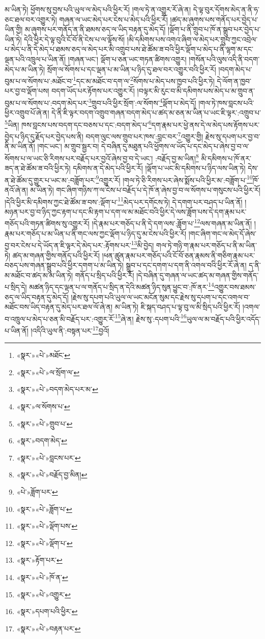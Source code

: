 མ་ཡིན་ཏེ། ཕྱོགས་སུ་བྱས་པའི་ཡུལ་ལ་མེད་པའི་ཕྱིར་རོ། །གལ་ཏེ་ན་འགྱུར་རོ་ཞེ་ན། དེ་ལྟ་བུར་དོགས་མེད་ན་ནི་ཧ་ཅང་ཐལ་བར་འགྱུར་ཏེ། གཞན་ལ་ཡང་མེད་པར་ངེས་པ་མེད་པའི་ཕྱིར་རོ། །ཚད་མ་ཞུགས་པས་གནོད་པར་བྱེད་པ་ཡིན་གྱི། མ་ཞུགས་པར་གནོད་ན་ནི་ཐམས་ཅད་ལ་ཡིད་བརྟན་དུ་མེད་དོ། །ལྡོག་པ་ནི་གྲུབ་པ་ཁོ་ན་སྒྲུབ་པར་བྱེད་པ་ཡིན་ཏེ། དེའི་ཕྱིར་དེ་ལྟ་བུའི་ངོ་བོ་ནི་ངེས་པ་ལ་ལྟོས་སོ། །མི་དམིགས་པས་འགའ་ཞིག་ལ་མེད་པར་གྲུབ་ཀྱང་འབྲེལ་པ་མེད་པ་ནི་དེ་མེད་པ་ཐམས་ཅད་ལ་མེད་པར་མི་འགྲུབ་པས་ཐེ་ཚོམ་ཟ་བའི་ཕྱིར་ལྡོག་པ་མེད་པ་ནི་ལྷག་མ་དང་ལྡན་པའི་འཁྲུལ་པ་ཡིན་ནོ། །གཞན་ཡང་། ལྡོག་པ་ཅན་ཡང་གཏན་ཚིགས་འགྱུར། །གསོན་པའི་ལུས་འདི་ནི་བདག་མེད་པ་མ་ཡིན་ཏེ། སྲོག་ལ་སོགས་པ་དང་ལྡན་པ་མ་ཡིན་པ་ཉིད་དུ་ཐལ་བར་འགྱུར་བའི་ཕྱིར་རོ། །བདག་མེད་པ་བུམ་པ་ལ་སོགས་པ་:མཐོང་བ་\footnote{«སྣར་»«པེ་»མཐོང་}དང་མ་མཐོང་བ་དག་ལ་\footnote{«སྣར་»«པེ་»ལ་སྲོག་ལ་}སོགས་པ་མེད་པས་ཁྱབ་པའི་ཕྱིར་ཏེ། དེ་ལོག་ན་ཁྱབ་པར་བྱ་བ་ལྡོག་པས། བདག་ཡོད་པར་རྟོགས་པར་འགྱུར་རོ། །བལྟར་མི་རུང་བ་མི་དམིགས་པས་མེད་པ་མ་གྲུབ་ན་བུམ་པ་ལ་སོགས་པ་:བདག་མེད་པར་\footnote{«སྣར་»«པེ་»བདག་མེད་པར་མ་}གྲུབ་པའི་ཕྱིར་སྲོག་:ལ་སོགས་\footnote{«སྣར་»ལ་སོགས་པ་}ལྡོག་པ་མེད་དོ། །གལ་ཏེ་ཁས་བླངས་པའི་ཕྱིར་འགྲུབ་པོ་ཞེ་ན། དེ་ནི་ཇི་ལྟར་བདག་འགྲུབ་གཞན་བདག་མེད་པ་ཚད་མ་ཅན་མ་ཡིན་པ་ཡང་ཇི་ལྟར་:འགྲུབ་པ་\footnote{«སྣར་»«པེ་»གྲུབ་པ་}ཡིན། ཁས་བླངས་པས་བདག་དང་བཅས་པ་དང་:བདག་མེད་པ་\footnote{«སྣར་»བདག་མེད་}དག་རྣམ་པར་ཕྱེ་ནས་དེ་ལ་མེད་པས་རྟོགས་པར་བྱེད་པ་ཉིད་དུ་རྗོད་པར་བྱེད་པས་ནི། བདག་ལུང་ལས་གྲུབ་པར་ཁས་:བླང་བར་\footnote{«སྣར་»«པེ་»བླངས་པར་}འགྱུར་གྱི། རྗེས་སུ་དཔག་པར་བྱ་བ་ནི་མ་ཡིན་ནོ། །གང་ཡང་། མ་གྲུབ་སྦྱར་བ། དེ་བཞིན་དུ་མཐུན་པའི་ཕྱོགས་ལ་ཡོད་པ་དང་མེད་པ་ཞེས་བྱ་བ་ལ་སོགས་པ་ལ་ཡང་ཅི་རིགས་པར་བརྗོད་པར་བྱའོ་ཞེས་བྱ་བ་དེ་ཡང་། :བརྗོད་བྱ་མ་ཡིན།\footnote{«སྣར་»«པེ་»བརྗོད་བྱ་མིན།} མི་དམིགས་པ་ཁོ་ནར་ཟད་ན་ཐེ་ཚོམ་ཟ་བའི་ཕྱིར་ཏེ། དམིགས་ན་དེ་མེད་པའི་ཕྱིར་རོ། །ལྡོག་པ་ཡང་མི་དམིགས་པ་ཉིད་ལས་ཡིན་ཏེ། དེས་ན་ཐེ་ཚོམ་དུ་གྱུར་པ་ཡང་མ་:བཟློག་པར་\footnote{«པེ་»ཟློག་པར་}འགྱུར་རོ། །གལ་ཏེ་ཅི་རིགས་པར་ཞེས་སྨོས་པའི་ཕྱིར་མ་:བཟློག་པ་\footnote{«སྣར་»«པེ་»ཟློག་པ་}ཁོ་ནའོ་ཞེ་ན། མ་ཡིན་ཏེ། གང་ཞིག་གཉིས་ཀ་ལ་ངེས་པ་བརྗོད་པ་དེ་ཁོ་ན་ཞེས་བྱ་བ་ལ་སོགས་པ་གསུངས་པའི་ཕྱིར་རོ། །དེའི་ཕྱིར་མི་དམིགས་ཀྱང་ཐེ་ཚོམ་ཟ་བས་:ལྡོག་པ་\footnote{«སྣར་»«པེ་»ལྡོག་པས་}མེད་པར་དགོངས་ཏེ། དེ་དགག་པར་བཤད་པ་ཡིན་ནོ། །མཉན་པར་བྱ་བ་ཉིད་ཀྱང་རྟག་པ་དང་མི་རྟག་པ་དག་ལ་མ་མཐོང་བའི་ཕྱིར་དེ་ལས་ཟློག་པས་དེ་དག་རྣམ་པར་གཅོད་པའི་གཏན་ཚིགས་སུ་འགྱུར་རོ། །དེ་རྣམ་པར་གཅོད་པ་ནི་དེ་དག་ལས་:ཟློག་པ་\footnote{«སྣར་»«པེ་»ལྡོག་པ་}ལས་གཞན་མ་ཡིན་ནོ། །རྣམ་པར་གཅོད་པ་མ་ཡིན་པ་ནི་གང་ལས་ཀྱང་ལྡོག་པ་ཉིད་དུ་མ་ངེས་པའི་ཕྱིར་རོ། །གང་ཞིག་གང་ལ་མེད་དོ་ཞེས་བྱ་བར་ངེས་པ་དེ་ཡོད་ན་ཇི་ལྟར་དེ་མེད་པར་:རྟོགས་པར་\footnote{«སྣར་»རྟོག་པར་}མི་བྱེད། གལ་ཏེ་གཉི་ག་རྣམ་པར་གཅོད་པ་ནི་མ་ཡིན་ཏེ། ཚད་མ་གཞན་གྱིས་གནོད་པའི་ཕྱིར་རོ། །ཕན་ཚུན་རྣམ་པར་གཅོད་པའི་ངོ་བོ་ཅན་རྣམས་ནི་གཅིག་རྣམ་པར་བཅད་པས་གཞན་སྒྲུབ་པའི་ཕྱིར་དགག་པ་མ་ཡིན་ཏེ། སྒྲུབ་པ་དང་དགག་པ་དག་ནི་འགལ་བའི་ཕྱིར་རོ་ཞེ་ན། ད་ནི་མ་མཐོང་བ་ཚད་མ་མ་ཡིན་ཏེ། གནོད་པ་སྲིད་པའི་ཕྱིར་རོ། །དེ་བཞིན་དུ་གཞན་ལ་ཡང་ཚད་མ་གཞན་གྱིས་གནོད་པ་སྲིད་དེ། མཚན་ཉིད་དང་ལྡན་པ་ལ་གནོད་པ་སྲིད་ན་དེའི་མཚན་ཉིད་སུན་ཕྱུང་བ་:ཁོ་ནར་\footnote{«སྣར་»«པེ་»ཁོ་ན་}འགྱུར་བས་ཐམས་ཅད་ལ་ཡིད་བརྟན་དུ་མེད་དོ། །རྗེས་སུ་དཔག་པའི་ཡུལ་ལ་ཡང་མངོན་སུམ་དང་རྗེས་སུ་དཔག་པ་དང་འགལ་བ་མཐོང་བས་ཡིད་བརྟན་དུ་མེད་པར་ཐལ་ལོ་ཞེ་ན། མ་ཡིན་ཏེ། ཇི་སྐད་བཤད་པ་ལྟ་བུ་ལ་མི་སྲིད་པའི་ཕྱིར་རོ། །འགལ་བ་འཁྲུལ་པ་མེད་པ་ཅན་མི་བརྗོད་པར་:འགྱུར་རོ་\footnote{«སྣར་»«པེ་»འགྱུར་}ཞེ་ན། རྗེས་སུ་:དཔག་པའི་\footnote{«སྣར་»དཔག་པའི་ཕྱིར་}ཡུལ་ལ་མ་བརྗོད་པའི་ཕྱིར་འདོད་པ་ཡིན་ནོ། །འདིའི་ཡུལ་ནི་:བསྟན་པར་\footnote{«སྣར་»«པེ་»བརྟན་པར་}བྱའོ། 